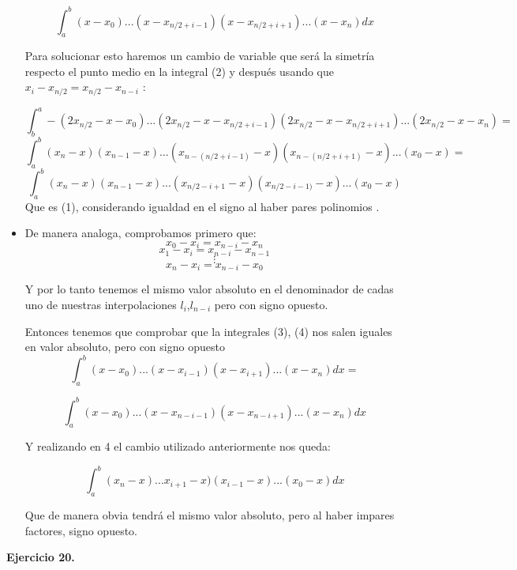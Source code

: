 \documentclass[11pt]{article}
\begin{document}
\begin{itemize}
 \begin{equation}
  \int_a^b (x-x_0)...(x-x_{n/2+i-1}) (x-x_{n/2+i+1}) ... (x-x_n)dx 
\end{equation}
 
 Para solucionar esto haremos un cambio de variable que será la simetría respecto el punto medio en la integral (2) y después usando que $x_i - x_{n/2} = x_{n/2}-x_{n-i}$ : 
 
 $$\int_b^a - (2x_{n/2}-x-x_0) ...(2x_{n/2}-x-x_{n/2+i-1}) (2x_{n/2}-x-x_{n/2+i+1})...(2x_{n/2}-x-x_n) = $$
 $$\int_a^b (x_n-x)(x_{n-1}-x) ...(x_{n-(n/2+i-1)}-x) (x_{n-(n/2+i+1)}-x)...(x_0-x) = $$
 $$\int_a^b (x_n-x)(x_{n-1}-x) ...(x_{n/2-i+1}-x) (x_{n/2-i-1)}-x)...(x_0-x)$$
  Que es (1), considerando igualdad en el signo al haber pares polinomios .
  
  \item De manera analoga, comprobamos primero que:
  $$ x_0  - x_i = x_{n-i} - x_n $$
  $$ x_1  - x_i = x_{n-i} - x_{n-1} $$
 $$ \vdots$$
  $$ x_n  - x_i = x_{n-i} - x_0 $$
 
 Y por lo tanto tenemos el mismo valor absoluto en el denominador de cadas uno de nuestras interpolaciones $l_i$,$l_{n-i}$ pero con signo opuesto.
 
 Entonces tenemos que comprobar que la integrales (3), (4) nos salen iguales en valor absoluto, pero con signo opuesto
  \begin{equation}
 \int_a^b (x-x_0)...(x-x_{i-1}) (x-x_{i+1}) ... (x-x_n)dx =
 \end{equation}

 \begin{equation}
  \int_a^b (x-x_0)...(x-x_{n-i-1}) (x-x_{n-i+1}) ... (x-x_n)dx 
\end{equation}

Y realizando en 4 el cambio utilizado anteriormente nos queda:

$$  \int_a^b (x_n-x)...x_{i+1}-x) (x_{i-1}-x) ... (x_0-x)dx $$

Que de manera obvia tendrá el mismo valor absoluto, pero al haber impares factores, signo opuesto.

\end{itemize}

\textbf{Ejercicio 20.}
\end{document}

